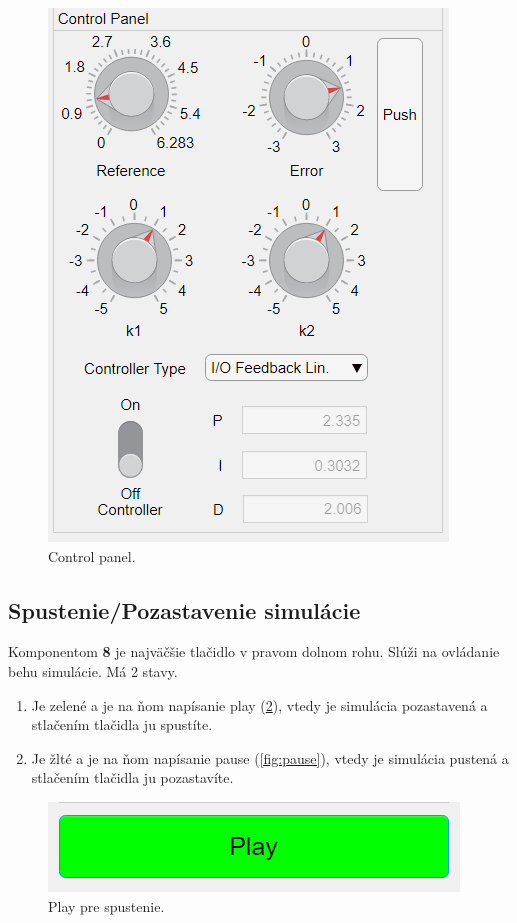 \makeatletter
\setlength{\@fptop}{0pt}
\makeatother
   \begin{figure}[h!]
 	\centering
 	\includegraphics[width=0.9\linewidth]{control}
 	\caption{Control panel.}
 	\label{fig:control}
 \end{figure}
\clearpage
 \subsection{Spustenie/Pozastavenie simulácie}  
  Komponentom \textbf{8} je najväčšie tlačidlo v pravom dolnom rohu. Slúži na ovládanie behu simulácie. Má 2 stavy.
  \begin{enumerate}
  	\item Je zelené a je na ňom napísanie play (\cref{fig:play}), vtedy je simulácia pozastavená a stlačením tlačidla ju spustíte.
  	\item Je žlté a je na ňom napísanie pause (\cref{fig:pause}), vtedy je simulácia pustená a stlačením tlačidla ju pozastavíte.
  \end{enumerate} 
   	 \begin{figure}[h!]
  	\centering
  	\includegraphics[width=0.6\linewidth]{play}
  	\caption{Play pre spustenie.}
  	\label{fig:play}
  \end{figure}  

